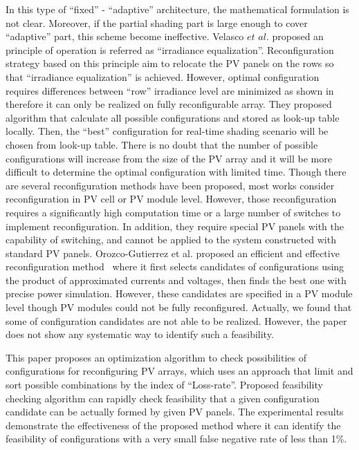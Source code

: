 \documentclass[journal]{IEEEtran}
\begin{document}
In this type of ``fixed'' - ``adaptive'' architecture, the mathematical formulation is not clear.
Moreover, if the partial shading part is large enough to cover ``adaptive'' part, this scheme become ineffective.
Velasco $et$ $al.$\cite{Velasco-Quesada2009,velasco2008grid,velasco2005energy} proposed an principle of operation is referred as ``irradiance equalization''.
Reconfiguration strategy based on this principle aim to relocate the PV panels on the rows so that ``irradiance equalization'' is achieved.
However, optimal configuration requires differences between ``row'' irradiance level are minimized as shown in \cite{Velasco-Quesada2009} therefore it can only be realized on fully reconfigurable array.
They proposed algorithm that calculate all possible configurations and stored as look-up table locally.
Then, the ``best'' configuration for real-time shading scenario will be chosen from look-up table.
There is no doubt that the number of possible configurations will increase from the size of the PV array and it will be more difficult to determine the optimal configuration with limited time.
Though there are several reconfiguration methods have been proposed, most works consider reconfiguration in PV cell or PV module level.
However, those reconfiguration requires a significantly high computation time or a large number of switches to implement reconfiguration.
In addition, they require special PV panels with the capability of switching, and cannot be applied to the system constructed with standard PV panels.
Orozco-Gutierrez et al. proposed an efficient and effective reconfiguration method~\cite{Orozco-Gutierrez2016} where it first selects candidates of configurations using the product of approximated currents and voltages,
then finds the best one with precise power simulation. 
However, these candidates are specified in a PV module level though PV modules could not be fully reconfigured. Actually, we found that some of configuration candidates are not able to be realized. However, the paper~\cite{Orozco-Gutierrez2016}  does not show any systematic way to identify such a feasibility. 

This paper proposes an optimization algorithm to check possibilities of configurations for reconfiguring PV arrays, which uses an approach that limit and sort possible combinations by the index of ``Loss-rate''.
Proposed feasibility checking algorithm can rapidly check feasibility that a given configuration candidate can be actually formed by given PV panels.
The experimental results demonstrate the effectiveness of the proposed method where it can identify the feasibility of configurations with a very small false negative rate of less than 1\%.
\end{document}
